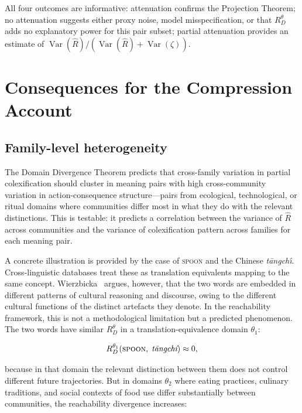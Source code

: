\documentclass[12pt]{article}
\theoremstyle{rthm}
\theoremstyle{rdef}
\theoremstyle{remark}
\newcommand{\RD}[1][\theta]{R_{D}^{#1}}
\begin{document}
All four outcomes are informative: attenuation confirms the Projection Theorem;
no attenuation suggests either proxy noise, model misspecification, or that $\RD$
adds no explanatory power for this pair subset; partial attenuation provides an
estimate of $\operatorname{Var}(\widehat{R}) / (\operatorname{Var}(\widehat{R}) +
\operatorname{Var}(\zeta))$.

\section{Consequences for the Compression Account}
\label{sec:consequences}

\subsection{Family-level heterogeneity}

The Domain Divergence Theorem predicts that cross-family variation in partial
colexification should cluster in meaning pairs with high cross-community
variation in action-consequence structure---pairs from ecological, technological,
or ritual domains where communities differ most in what they do with the relevant
distinctions. This is testable: it predicts a correlation between the variance
of $\widehat{R}$ across communities and the variance of colexification pattern
across families for each meaning pair.

A concrete illustration is provided by the case of \textsc{spoon} and the
Chinese \textit{t\={a}ngch\'{\i}}.
Cross-linguistic databases treat these as translation equivalents mapping to the
same concept. Wierzbicka~\cite{wierzbicka2015} argues, however, that the two
words are embedded in different patterns of cultural reasoning and discourse,
owing to the different cultural functions of the distinct artefacts they
denote. In the reachability framework, this is not a methodological limitation
but a predicted phenomenon. The two words have similar $\RD$ in a
translation-equivalence domain $\theta_1$:

\[
\RD[\theta_1](\textsc{spoon},\; \textit{t\={a}ngch\'{i}}) \approx 0,
\]

because in that domain the relevant distinction between them does not control
different future trajectories. But in domains $\theta_2$ where eating practices,
culinary traditions, and social contexts of food use differ substantially between
communities, the reachability divergence increases:
\end{document}
